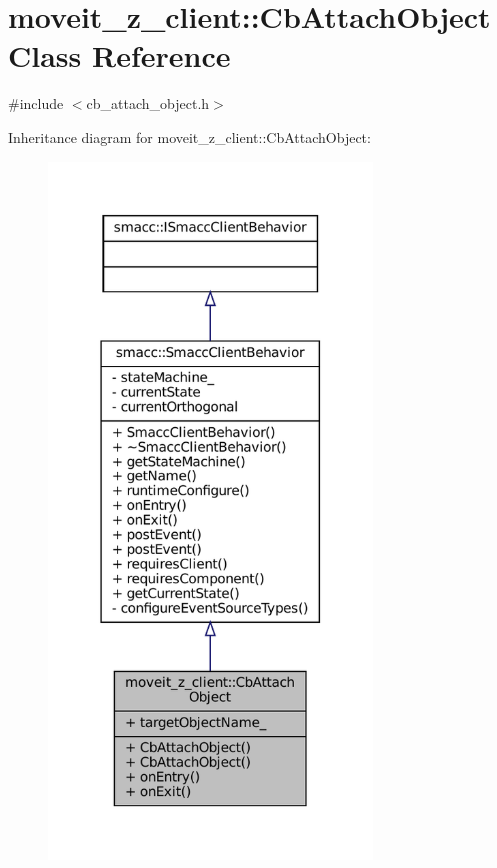 \hypertarget{classmoveit__z__client_1_1CbAttachObject}{}\section{moveit\+\_\+z\+\_\+client\+:\+:Cb\+Attach\+Object Class Reference}
\label{classmoveit__z__client_1_1CbAttachObject}


{\ttfamily \#include $<$cb\+\_\+attach\+\_\+object.\+h$>$}



Inheritance diagram for moveit\+\_\+z\+\_\+client\+:\+:Cb\+Attach\+Object\+:
\nopagebreak
\begin{figure}[H]
\begin{center}
\leavevmode
\includegraphics[width=244pt]{classmoveit__z__client_1_1CbAttachObject__inherit__graph}
\end{center}
\end{figure}


